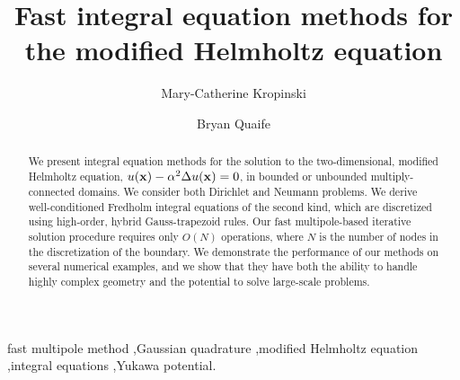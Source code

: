 \documentclass[preprint,12pt]{elsarticle}
\newcommand{\x}{{\bf x}}
\begin{document}




\begin{frontmatter}

\title{Fast integral equation methods for the modified Helmholtz equation}
 \author{Mary-Catherine Kropinski}
 \address[mcak]{Department of Mathematics, Simon Fraser University,
 Burnaby, British Columbia, Canada V5A 1S6}
 \author{Bryan Quaife}

\begin{abstract}
  We present integral equation methods for the
  solution to the two-dimensional, modified Helmholtz equation, $u(\x) - \alpha^2 \Delta
  u(\x) = 0$, in bounded or unbounded multiply-connected domains.  We consider both  Dirichlet and Neumann problems.  
  We derive well-conditioned Fredholm integral equations of the second kind, which are   discretized using high-order, hybrid Gauss-trapezoid rules.  
  Our fast multipole-based iterative solution procedure requires only
  $O(N)$ operations, where $N$ is the number of nodes in the
  discretization of the boundary.  
We demonstrate the performance of our methods on several numerical examples, and 
we show that they have both the ability to handle highly complex geometry and the potential to solve large-scale problems.
\end{abstract}

\begin{keyword}
fast multipole method \sep Gaussian quadrature \sep modified Helmholtz
equation \sep integral equations \sep Yukawa potential.
\end{keyword}
\end{frontmatter}
\end{document}
